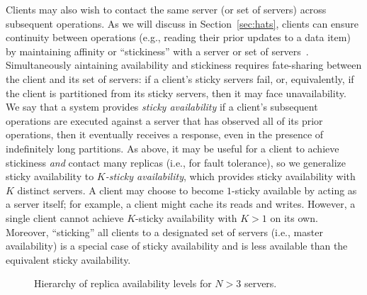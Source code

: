 Clients may also wish to contact the same server (or set of servers)
across subsequent operations. As we will discuss in
Section~\ref{sec:hats}, clients can ensure continuity between
operations (e.g., reading their prior updates to a data item) by
maintaining affinity or ``stickiness'' with a server or set of
servers~\cite{vogels-defs}. Simultaneously aintaining availability and
stickiness requires fate-sharing between the client and its set of
servers: if a client's sticky servers fail, or, equivalently, if the
client is partitioned from its sticky servers, then it may face
unavailability. We say that a system provides \textit{sticky
  availability} if a client's subsequent operations are executed
against a server that has observed all of its prior operations, then
it eventually receives a response, even in the presence of
indefinitely long partitions. As above, it may be useful for a client
to achieve stickiness \textit{and} contact many replicas (i.e., for
fault tolerance), so we generalize sticky availability to
\textit{$K$-sticky availability}, which provides sticky availability
with $K$ distinct servers. A client may choose to become $1$-sticky
available by acting as a server itself; for example, a client might
cache its reads and writes. However, a single client cannot achieve
$K$-sticky availability with $K>1$ on its own. Moreover, ``sticking''
all clients to a designated set of servers (i.e., master availability)
is a special case of sticky availability and is less available than
the equivalent sticky availability.

\begin{figure}
\centering
{}
\label{fig:availability-order}
\caption{Hierarchy of replica availability levels for $N>3$ servers.}
\end{figure}

